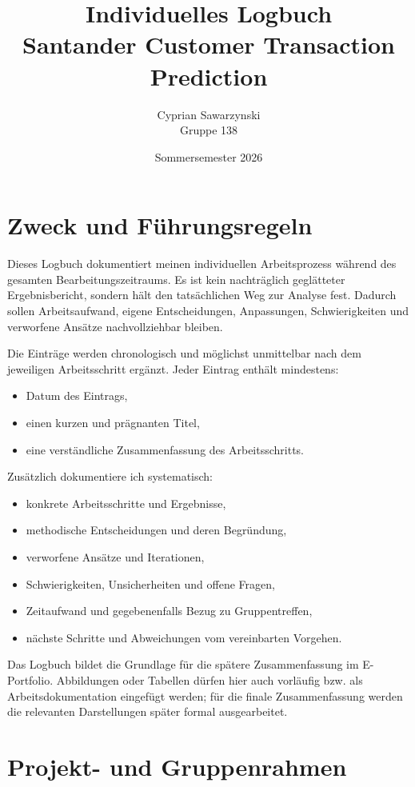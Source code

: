 \documentclass[11pt,a4paper]{article}
\title{\color{ADAblue}\textbf{Individuelles Logbuch}\\[0.4em]
       \large Santander Customer Transaction Prediction}
\author{Cyprian Sawarzynski\\Gruppe 138}
\date{Sommersemester 2026}
\begin{document}
\maketitle
\tableofcontents
\clearpage
\fi

\section{Zweck und Führungsregeln}

Dieses Logbuch dokumentiert meinen individuellen Arbeitsprozess während des gesamten
Bearbeitungszeitraums. Es ist kein nachträglich geglätteter Ergebnisbericht, sondern hält
den tatsächlichen Weg zur Analyse fest. Dadurch sollen Arbeitsaufwand, eigene Entscheidungen,
Anpassungen, Schwierigkeiten und verworfene Ansätze nachvollziehbar bleiben.

Die Einträge werden chronologisch und möglichst unmittelbar nach dem jeweiligen Arbeitsschritt
ergänzt. Jeder Eintrag enthält mindestens:

\begin{itemize}
  \item Datum des Eintrags,
  \item einen kurzen und prägnanten Titel,
  \item eine verständliche Zusammenfassung des Arbeitsschritts.
\end{itemize}

Zusätzlich dokumentiere ich systematisch:

\begin{itemize}
  \item konkrete Arbeitsschritte und Ergebnisse,
  \item methodische Entscheidungen und deren Begründung,
  \item verworfene Ansätze und Iterationen,
  \item Schwierigkeiten, Unsicherheiten und offene Fragen,
  \item Zeitaufwand und gegebenenfalls Bezug zu Gruppentreffen,
  \item nächste Schritte und Abweichungen vom vereinbarten Vorgehen.
\end{itemize}

Das Logbuch bildet die Grundlage für die spätere Zusammenfassung im E-Portfolio. Abbildungen
oder Tabellen dürfen hier auch vorläufig bzw. als Arbeitsdokumentation eingefügt werden;
für die finale Zusammenfassung werden die relevanten Darstellungen später formal ausgearbeitet.

\section{Projekt- und Gruppenrahmen}
\end{document}

